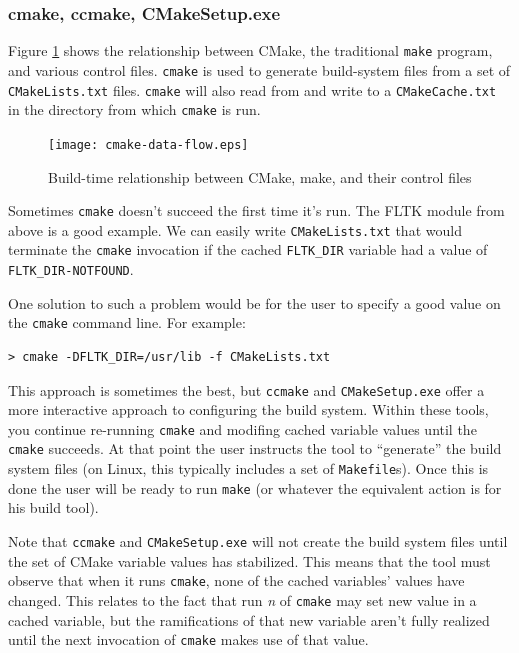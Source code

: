\documentclass[letterpaper,10pt]{article}
\begin{document}
\subsubsection{cmake, ccmake, CMakeSetup.exe}
\label{sec:ccmake}
Figure \ref{fig:cmake-data-flow} shows the relationship between CMake, the traditional
\verb|make| program, and various control files.
\verb|cmake| is used to generate build-system files from a set of \verb|CMakeLists.txt|
files.  \verb|cmake| will also read from and write to a \verb|CMakeCache.txt| in the
directory from which \verb|cmake| is run.


\begin{figure}
 \centering
\texttt{[image: cmake-data-flow.eps]}
   \caption{Build-time relationship between CMake, make, and their control files}
   \label{fig:cmake-data-flow}
\end{figure}



Sometimes \verb|cmake| doesn't succeed the first time it's run.  The FLTK module from
above is a good example.  We can easily write \verb|CMakeLists.txt| that would terminate
the \verb|cmake| invocation if the cached \verb|FLTK_DIR| variable had a value of \verb|FLTK_DIR-NOTFOUND|.

One solution to such a problem would be for the user to specify a good value on the
\verb|cmake| command line.  For example:
\begin{verbatim}
> cmake -DFLTK_DIR=/usr/lib -f CMakeLists.txt
\end{verbatim} 

This approach is sometimes the best, but \verb|ccmake| and \verb|CMakeSetup.exe| offer a
more interactive approach to configuring the build system.  Within these tools, you continue
re-running \verb|cmake| and modifing cached variable values until the \verb|cmake| succeeds.
At that point the user instructs the tool to ``generate'' the build system files (on Linux,
this typically includes a set of \verb|Makefile|s).  Once this is done the user will 
be ready to run \verb|make| (or whatever the equivalent action is for his build tool).

Note that \verb|ccmake| and \verb|CMakeSetup.exe| will not create the build system files
until the set of CMake variable values has stabilized.  This means that the tool must observe
that when it runs \verb|cmake|, none of the cached variables' values have changed.  This
relates to the fact that run \textit{n} of \verb|cmake| may set new value in a cached variable,
but the ramifications of that new variable aren't fully realized until the next invocation of
\verb|cmake| makes use of that value.
\end{document}
